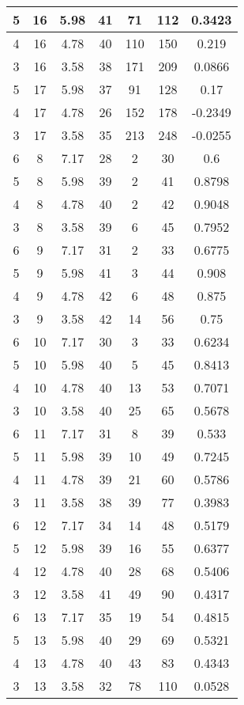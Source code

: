 \documentclass[letterpaper, 12pt]{article}
\begin{document}
\begin{longtable}{|c|c|c|c|c|c|c|}
\hline
5 & 16 & 5.98 & 41 & 71 & 112 & 0.3423 \\
\hline
4 & 16 & 4.78 & 40 & 110 & 150 & 0.219 \\
\hline
3 & 16 & 3.58 & 38 & 171 & 209 & 0.0866 \\
\hline
5 & 17 & 5.98 & 37 & 91 & 128 & 0.17 \\
\hline
4 & 17 & 4.78 & 26 & 152 & 178 & -0.2349 \\
\hline
3 & 17 & 3.58 & 35 & 213 & 248 & -0.0255 \\
\hline
6 & 8 & 7.17 & 28 & 2 & 30 & 0.6 \\
\hline
5 & 8 & 5.98 & 39 & 2 & 41 & 0.8798 \\
\hline
4 & 8 & 4.78 & 40 & 2 & 42 & 0.9048 \\
\hline
3 & 8 & 3.58 & 39 & 6 & 45 & 0.7952 \\
\hline
6 & 9 & 7.17 & 31 & 2 & 33 & 0.6775 \\
\hline
5 & 9 & 5.98 & 41 & 3 & 44 & 0.908 \\
\hline
4 & 9 & 4.78 & 42 & 6 & 48 & 0.875 \\
\hline
3 & 9 & 3.58 & 42 & 14 & 56 & 0.75 \\
\hline
6 & 10 & 7.17 & 30 & 3 & 33 & 0.6234 \\
\hline
5 & 10 & 5.98 & 40 & 5 & 45 & 0.8413 \\
\hline
4 & 10 & 4.78 & 40 & 13 & 53 & 0.7071 \\
\hline
3 & 10 & 3.58 & 40 & 25 & 65 & 0.5678 \\
\hline
6 & 11 & 7.17 & 31 & 8 & 39 & 0.533 \\
\hline
5 & 11 & 5.98 & 39 & 10 & 49 & 0.7245 \\
\hline
4 & 11 & 4.78 & 39 & 21 & 60 & 0.5786 \\
\hline
3 & 11 & 3.58 & 38 & 39 & 77 & 0.3983 \\
\hline
6 & 12 & 7.17 & 34 & 14 & 48 & 0.5179 \\
\hline
5 & 12 & 5.98 & 39 & 16 & 55 & 0.6377 \\
\hline
4 & 12 & 4.78 & 40 & 28 & 68 & 0.5406 \\
\hline
3 & 12 & 3.58 & 41 & 49 & 90 & 0.4317 \\
\hline
6 & 13 & 7.17 & 35 & 19 & 54 & 0.4815 \\
\hline
5 & 13 & 5.98 & 40 & 29 & 69 & 0.5321 \\
\hline
4 & 13 & 4.78 & 40 & 43 & 83 & 0.4343 \\
\hline
3 & 13 & 3.58 & 32 & 78 & 110 & 0.0528 \\

\end{longtable}
\end{document}
